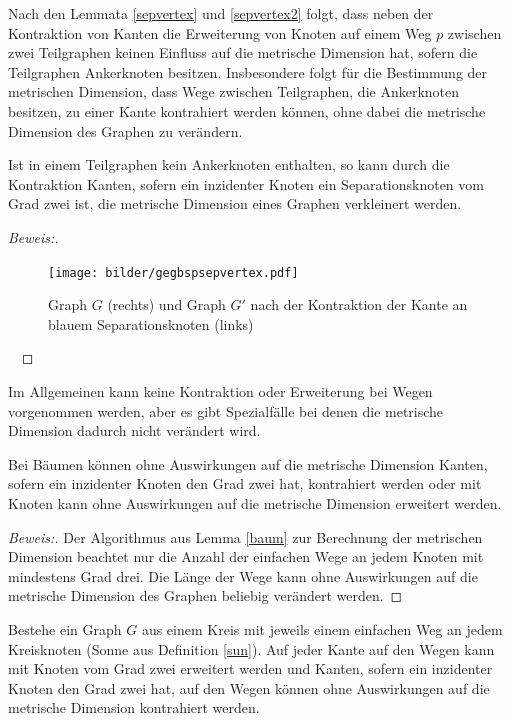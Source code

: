 \begin{bem}
Nach den Lemmata \ref{sepvertex} und \ref{sepvertex2} folgt, dass neben der Kontraktion von Kanten die Erweiterung von Knoten auf einem Weg $p$ zwischen zwei Teilgraphen keinen Einfluss auf die metrische Dimension hat, sofern die Teilgraphen Ankerknoten besitzen. Insbesondere folgt für die Bestimmung der metrischen Dimension, dass Wege zwischen Teilgraphen, die Ankerknoten besitzen, zu einer Kante kontrahiert werden können, ohne dabei die metrische Dimension des Graphen zu verändern.
\end{bem}
\begin{lem}
Ist in einem Teilgraphen kein Ankerknoten enthalten, so kann durch die Kontraktion Kanten, sofern ein inzidenter Knoten ein Separationsknoten vom Grad zwei ist, die metrische Dimension eines Graphen verkleinert werden.
\end{lem}
\begin{proof}[Beweis:] ~ \newline
\vspace{-7mm}
\begin{figure}[!h]
\centering
\texttt{[image: bilder/gegbspsepvertex.pdf]}
\caption{Graph $G$ (rechts) und Graph $G'$ nach der Kontraktion der Kante an blauem Separationsknoten (links)}
\end{figure} 
\vspace{-8mm}
~\linebreak
\end{proof}
Im Allgemeinen kann keine Kontraktion oder Erweiterung bei Wegen vorgenommen werden, aber es gibt Spezialfälle bei denen die metrische Dimension dadurch nicht verändert wird.
\begin{lem}
Bei Bäumen können ohne Auswirkungen auf die metrische Dimension Kanten, sofern ein inzidenter Knoten den Grad zwei hat, kontrahiert werden oder mit Knoten kann ohne Auswirkungen auf die metrische Dimension erweitert werden.
\end{lem}
\begin{proof}[Beweis:]
Der Algorithmus aus Lemma \ref{baum} zur Berechnung der metrischen Dimension beachtet nur die Anzahl der einfachen Wege an jedem Knoten mit mindestens Grad drei. Die Länge der Wege kann ohne Auswirkungen auf die metrische Dimension des Graphen beliebig verändert werden.
\end{proof}
\begin{lem}
\label{sonneerweiterung}
Bestehe ein Graph $G$ aus einem Kreis mit jeweils einem einfachen Weg an jedem Kreisknoten (Sonne aus Definition \ref{sun}). Auf jeder Kante auf den Wegen kann mit Knoten vom Grad zwei erweitert werden und Kanten, sofern ein inzidenter Knoten den Grad zwei hat, auf den Wegen können ohne Auswirkungen auf die metrische Dimension kontrahiert werden.
\end{lem}

